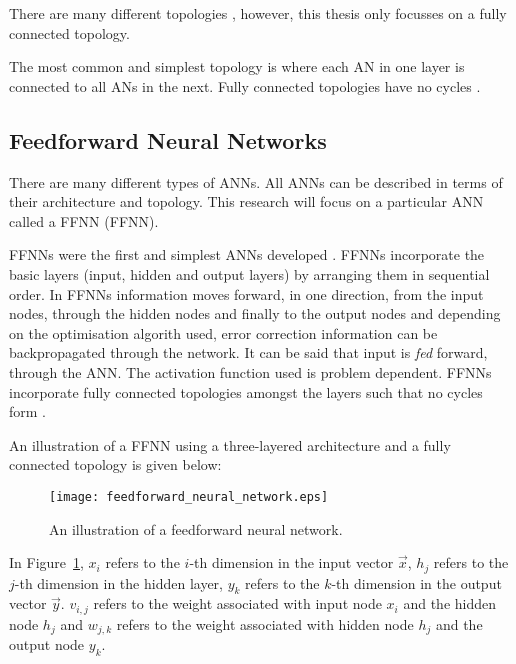 There are many different topologies \cite{ref:miikkulainen:2010}, however, this
thesis only focusses on a fully connected
topology.

The most common and simplest topology is where each \ac{AN} in one layer is
connected to all \acp{AN} in the next. Fully connected topologies have no
cycles \cite{ref:zell:1994}.


\subsection{Feedforward Neural Networks}
\label{sec:anns:anns:ffnns}

There are many different types of \acp{ANN}. All \acp{ANN} can be described
in terms of their architecture and topology. This research will focus on a
particular \ac{ANN} called a \acl{FFNN} (\acs{FFNN}).

\acp{FFNN} were the first and simplest \acp{ANN} developed
\cite{ref:schmidhuber:2015}. \acp{FFNN} incorporate the basic layers (input,
hidden and output layers) by arranging them in sequential order. In \acp{FFNN}
information moves forward, in one direction, from the input nodes, through the
hidden nodes and finally to the output nodes and depending on the optimisation
algorith used, error correction information can be backpropagated through the
network. It can be said that input is \textit{fed} forward, through the
\ac{ANN}. The activation function used is problem
dependent. \acp{FFNN} incorporate fully connected topologies amongst the layers
such that no cycles form \cite{ref:zell:1994}.

An illustration of a \ac{FFNN} using a three-layered architecture and a fully
connected topology is given below:

\begin{figure}[H]
    \centering
    \texttt{[image: feedforward\_neural\_network.eps]}
    \caption[A Feedforward neural network]{An
    illustration of a feedforward neural network.}
    \label{fig:ffnn}
\end{figure}

In Figure~\ref{fig:ffnn}, $x_i$ refers to the $i$-th dimension in the input
vector $\vec{x}$, $h_j$ refers to the $j$-th dimension in the hidden layer,
$y_k$ refers to the $k$-th dimension in the output vector $\vec{y}$. $v_{i,j}$
refers to the weight associated with input node $x_i$ and the hidden node $h_j$
and $w_{j,k}$ refers to the weight associated with hidden node $h_j$ and the
output node $y_k$.


